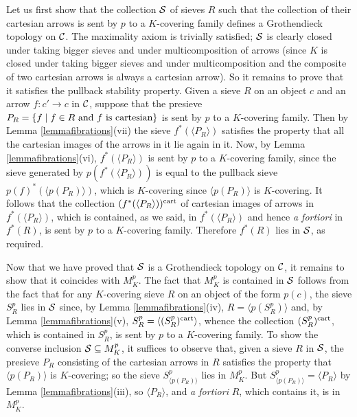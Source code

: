 \documentclass[a4paper,12pt]{article}
\begin{document}
\begin{proofs}
	Let us first show that the collection $\cal S$ of sieves $R$ such that the collection of their cartesian arrows is sent by $p$ to a $K$-covering family defines a Grothendieck topology on $\cal C$. The maximality axiom is trivially satisfied; $\cal S$ is clearly closed under taking bigger sieves and under multicomposition of arrows (since $K$ is closed under taking bigger sieves and under multicomposition and the composite of two cartesian arrows is always a cartesian arrow). So it remains to prove that it satisfies the pullback stability property. Given a sieve $R$ on an object $c$ and an arrow $f:c'\to c$ in $\cal C$, suppose that the presieve $P_{R}=\{f \mid f\in R \textup{ and } f \textup{ is cartesian}\}$ is sent by $p$ to a $K$-covering family. Then by Lemma \ref{lemmafibrations}(vii) the sieve $f^{\ast}(\langle P_{R}\rangle )$ satisfies the property that all the cartesian images of the arrows in it lie again in it. Now, by Lemma \ref{lemmafibrations}(vi), $f^{\ast}(\langle P_{R}\rangle )$ is sent by $p$ to a $K$-covering family, since the sieve generated by $p(f^{\ast}(\langle P_{R}\rangle ))$ is equal to the pullback sieve $p(f)^{\ast}(\langle p(P_{R})\rangle )$, which is $K$-covering since $\langle p(P_{R})\rangle $ is $K$-covering. It follows that the collection $(f^{\ast}(\langle P_{R}\rangle ))^{\textup{cart}}$ of cartesian images of arrows in  $f^{\ast}(\langle P_{R}\rangle )$, which is contained, as we said, in $f^{\ast}(\langle P_{R}\rangle )$ and hence \emph{a fortiori} in $f^{\ast}(R)$, is sent by $p$ to a $K$-covering family. Therefore $f^{\ast}(R)$ lies in $\cal S$, as required. 
	
	Now that we have proved that $\cal S$ is a Grothendieck topology on $\cal C$, it remains to show that it coincides with $M^{p}_{K}$. The fact that $M^{p}_{K}$ is contained in $\cal S$ follows from the fact that for any $K$-covering sieve $R$ on an object of the form $p(c)$, the sieve $S^{p}_{R}$ lies in $\cal S$ since, by Lemma \ref{lemmafibrations}(iv), $R=\langle p(S^{p}_{R})\rangle $ and, by Lemma \ref{lemmafibrations}(v), $S^{p}_{R}=\langle (S^{p}_{R})^{\textup{cart}}\rangle $, whence the collection $(S^{p}_{R})^{\textup{cart}}$, which is contained in $S^{p}_{R}$, is sent by $p$ to a $K$-covering family. To show the converse inclusion ${\cal S}\subseteq M^{p}_{K}$, it suffices to observe that, given a sieve $R$ in $\cal S$, the presieve $P_{R}$ consisting of the cartesian arrows in $R$ satisfies the property that $\langle p(P_{R})\rangle $ is $K$-covering; so the sieve $S^{p}_{\langle p(P_{R})\rangle }$ lies in $M^{p}_{K}$. But $S^{p}_{\langle p(P_{R})\rangle }=\langle P_{R}\rangle $ by Lemma \ref{lemmafibrations}(iii), so $\langle P_{R}\rangle $, and \emph{a fortiori} $R$, which contains it, is in  $M^{p}_{K}$.  
\end{proofs}
\end{document}
